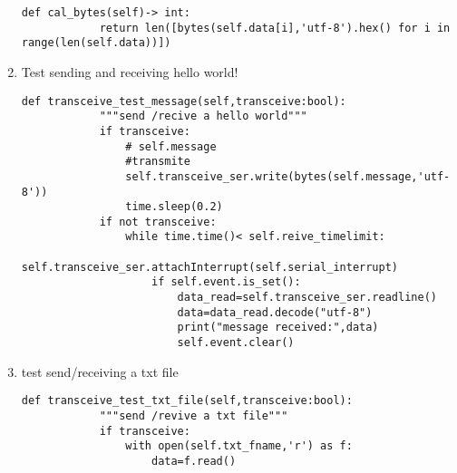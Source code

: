 \begin{enumerate}
    \begin{lstlisting}[style=mystyle]
        def cal_bytes(self)-> int:
		    return len([bytes(self.data[i],'utf-8').hex() for i in range(len(self.data))])
    \end{lstlisting}
    \item Test sending and receiving  hello world!
    \begin{lstlisting}[style=mystyle]
        def transceive_test_message(self,transceive:bool):
            """send /recive a hello world"""
            if transceive:
                # self.message
                #transmite
                self.transceive_ser.write(bytes(self.message,'utf-8'))
                time.sleep(0.2)
            if not transceive:
                while time.time()< self.reive_timelimit:
                    self.transceive_ser.attachInterrupt(self.serial_interrupt)
                    if self.event.is_set():
                        data_read=self.transceive_ser.readline()
                        data=data_read.decode("utf-8")
                        print("message received:",data)
                        self.event.clear()
    \end{lstlisting}
    \item test send/receiving a txt file
    \begin{lstlisting}[style=mystyle]
        def transceive_test_txt_file(self,transceive:bool):
            """send /revive a txt file"""
            if transceive:
                with open(self.txt_fname,'r') as f:
                    data=f.read()


\end{lstlisting}
\end{enumerate}

